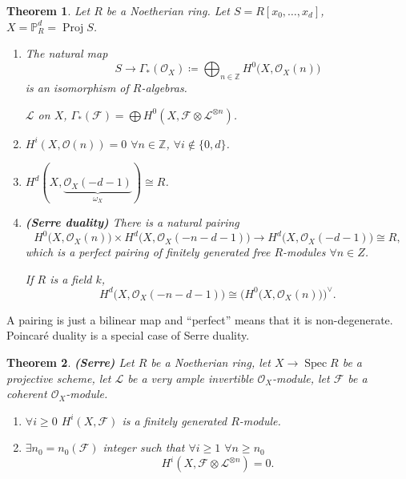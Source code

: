 \documentclass[12pt]{article}
\DeclareMathOperator{\Spec}{Spec}
\DeclareMathOperator{\Proj}{Proj}
\newtheorem*{theorem}{Theorem}
\theoremstyle{definition}
\begin{document}
\begin{theorem}
Let $R$ be a Noetherian ring. Let $S=R[x_0,\ldots,x_d]$, $X=\mathbb{P}_R^d=\Proj S$.

\begin{enumerate}[label=\arabic*)]
\item The natural map
\[S\longrightarrow\Gamma_*(\mathcal{O}_X)\coloneqq\bigoplus_{n\in\mathbb{Z}}H^0\big(X,\mathcal{O}_X(n)\big)\]
is an isomorphism of $R$-algebras.

$\mathcal{L}$ on $X$, $\Gamma_*(\mathcal{F})=\bigoplus H^0(X,\mathcal{F}\otimes\mathcal{L}^{\otimes n})$.

\item $H^i(X,\mathcal{O}(n))=0$ $\forall n\in\mathbb{Z}$, $\forall i\notin\{0,d\}$.

\item $H^d(X,\underbrace{\mathcal{O}_X(-d-1)}_{\omega_X})\cong R$.

\item \emph{\textbf{(Serre duality)}} There is a natural pairing
\[H^0\big(X,\mathcal{O}_X(n)\big)\times H^d(X,\mathcal{O}_X(-n-d-1)\big)\longrightarrow H^d\big(X,\mathcal{O}_X(-d-1)\big)\cong R,\]
which is a perfect pairing of finitely generated free $R$-modules $\forall n\in Z$.

If $R$ is a field $k$,
\[H^d\big(X,\mathcal{O}_X(-n-d-1)\big)\cong\big(H^0\big(X,\mathcal{O}_X(n)\big)\big)^{\vee}.\]
\end{enumerate}
\end{theorem}

A pairing is just a bilinear map and ``perfect'' means that it is non-degenerate. Poincar\'{e} duality is a special case of Serre duality.

\begin{theorem}
\emph{\textbf{(Serre)}} Let $R$ be a Noetherian ring, let $X\rightarrow\Spec R$ be a projective scheme, let $\mathcal{L}$ be a very ample invertible $\mathcal{O}_X$-module, let $\mathcal{F}$ be a coherent $\mathcal{O}_X$-module.

\begin{enumerate}[label=\arabic*)]
\item $\forall i\geq0$ $H^i(X,\mathcal{F})$ is a finitely generated $R$-module.

\item $\exists n_0=n_0(\mathcal{F})$ integer such that $\forall i\geq1$ $\forall n\geq n_0$
\[H^i(X,\mathcal{F}\otimes\mathcal{L}^{\otimes n})=0.\]
\end{enumerate}
\end{theorem}
\end{document}
